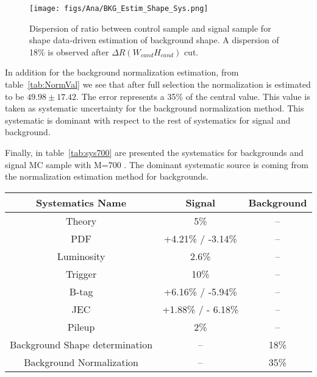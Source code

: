 \begin{figure}[!Hhtbp]
  \begin{center}
    \texttt{[image: figs/Ana/BKG\_Estim\_Shape\_Sys.png]}
    \caption{Dispersion of ratio between control sample and signal sample for shape data-driven estimation of background shape. A dispersion of 18\% is observed after $\Delta R (W_{cand} H_{cand})$ cut.}
    \label{fig:ShapeSys}
  \end{center}
\end{figure}

In addition for the background normalization estimation, from table~\ref{tab:NormVal} we see that after full selection the normalization is estimated to be $49.98\pm17.42$. The error represents a 35\% of the central value. This value is taken as systematic uncertainty for the background normalization method. This systematic is dominant with respect to the rest of systematics for signal and background.

Finally, in table~\ref{tab:sys700} are presented the systematics for backgrounds and signal MC sample with M=700 \GeVcc. The dominant systematic source is coming from the normalization estimation method for backgrounds.

\begin{table*}[htbH]
\begin{center}
\begin{tabular}{|c|c|c|}
\hline 
Systematics Name & Signal & Background \\
\hline
Theory & 5\% & --\\
PDF & +4.21\% / -3.14\% & --\\
Luminosity & 2.6\% & --\\
Trigger & 10\% & --\\
B-tag & +6.16\% / -5.94\% & --\\
JEC & +1.88\% / - 6.18\% & --\\
Pileup & 2\% & --\\
Background Shape determination & -- & 18\%\\
Background Normalization & -- & 35\%\\
\hline
\end{tabular}
\caption{Summary of uncertainties in the case of signal mass point at 700 GeV/$c^{2}$ and for background.\label{tab:sys700}}
\end{center}
\end{table*}

